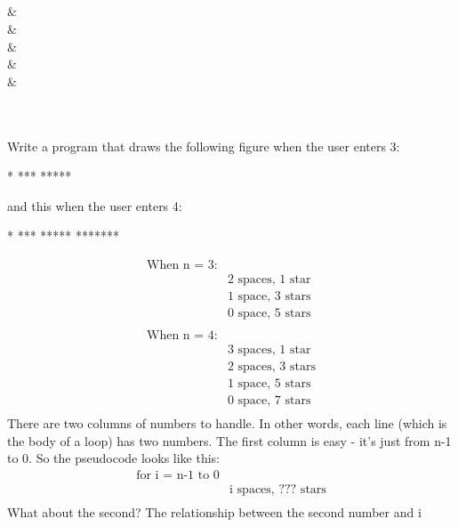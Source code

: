 \begin{console}
\begin{ex}
\begin{flalign*}
\\
\\
\\
\\
&\\
&\\
&\\
&\\
&\\
\\
\\
\end{flalign*}
\end{ex}
\begin{ex} Write a program that draws the following figure when
the user enters 3:
\begin{console}
  *
 ***
*****
\end{console}
and this when the user enters 4:
\begin{console}
   *
  ***
 *****
*******
\end{console}
\begin{align*}
\text{When n = 3:}\\
&     \text{2 spaces, 1 star}\\
&     \text{1 space, 3 stars}\\
&     \text{0 space, 5 stars}\\\\
\text{When n = 4:}\\
&     \text{3 spaces, 1 star}\\
&     \text{2 spaces, 3 stars}\\
&     \text{1 space, 5 stars}\\
&     \text{0 space, 7 stars}\\
\end{align*}
There are two columns of numbers to handle. In other words, each line
(which is the body of a loop) has two numbers. The first column is easy - it's just from n-1 to 0. So the pseudocode looks like this:
\begin{align*}
    \text{for i = n-1 to 0}\\
&          \text{i spaces, ??? stars}\\
\end{align*}
What about the second? The relationship between the second number and i

\end{ex}
\end{console}
